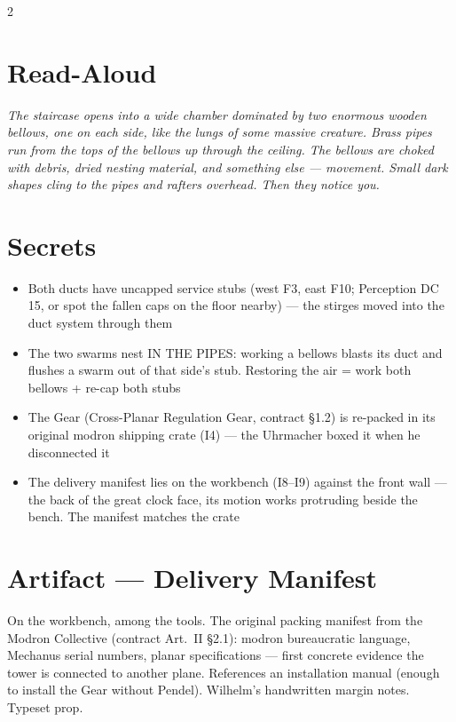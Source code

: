 \documentclass[10pt,letterpaper]{article}
\begin{document}
\begin{multicols}{2}

\section*{Read-Aloud}
\begin{readaloud}
\itshape
The staircase opens into a wide chamber dominated by two enormous wooden bellows, one on each side, like the lungs of some massive creature. Brass pipes run from the tops of the bellows up through the ceiling. The bellows are choked with debris, dried nesting material, and something else --- movement. Small dark shapes cling to the pipes and rafters overhead. Then they notice you.
\end{readaloud}

\section*{Secrets}
\begin{itemize}
\item Both ducts have uncapped service stubs (west F3, east F10; Perception DC 15, or spot the fallen caps on the floor nearby) --- the stirges moved into the duct system through them
\item The two swarms nest IN THE PIPES: working a bellows blasts its duct and flushes a swarm out of that side's stub. Restoring the air = work both bellows + re-cap both stubs
\item The Gear (Cross-Planar Regulation Gear, contract \S1.2) is re-packed in its original modron shipping crate (I4) --- the Uhrmacher boxed it when he disconnected it
\item The delivery manifest lies on the workbench (I8--I9) against the front wall --- the back of the great clock face, its motion works protruding beside the bench. The manifest matches the crate
\end{itemize}

\section*{Artifact --- Delivery Manifest}
On the workbench, among the tools. The original packing manifest from the Modron Collective (contract Art.\ II \S2.1): modron bureaucratic language, Mechanus serial numbers, planar specifications --- first concrete evidence the tower is connected to another plane. References an installation manual (enough to install the Gear without Pendel). Wilhelm's handwritten margin notes. Typeset prop.


\end{multicols}
\end{document}
